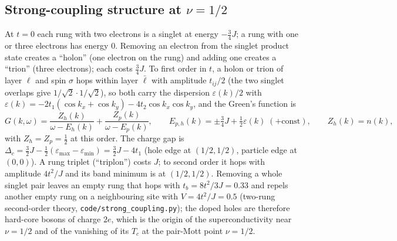 \documentclass[11pt]{article}
\newcommand{\nuh}{\nu=1/2}
\begin{document}
\subsection{Strong-coupling structure at $\nuh$}\label{sec:sc}
At $t=0$ each rung with two electrons is a singlet at energy $-\tfrac34J$; a rung with one or three electrons has energy $0$. Removing an electron from the singlet product state creates a ``holon'' (one electron on the rung) and adding one creates a ``trion'' (three electrons); each costs $\tfrac34J$. To first order in $t$, a holon or trion of layer $\ell$ and spin $\sigma$ hops within layer $\bar\ell$ with amplitude $t_{ij}/2$ (the two singlet overlaps give $1/\sqrt2\cdot1/\sqrt2$), so both carry the dispersion $\varepsilon(k)/2$ with $\varepsilon(k)=-2t_1(\cos k_x+\cos k_y)-4t_2\cos k_x\cos k_y$, and the Green's function is
\begin{equation}
G(k,\omega)=\frac{Z_h(k)}{\omega-E_h(k)}+\frac{Z_p(k)}{\omega-E_p(k)},\qquad E_{p,h}(k)=\pm\tfrac34J+\tfrac12\varepsilon(k)\;(+\text{const}),\qquad Z_h(k)=n(k),
\label{eq:G}
\end{equation}
with $Z_h=Z_p=\tfrac12$ at this order. The charge gap is $\Delta_c=\tfrac32J-\tfrac12(\varepsilon_{\max}-\varepsilon_{\min})=\tfrac32J-4t_1$ (hole edge at $(1/2,1/2)$, particle edge at $(0,0)$). A rung triplet (``triplon'') costs $J$; to second order it hops with amplitude $4t^2/J$ and its band minimum is at $(1/2,1/2)$. Removing a whole singlet pair leaves an empty rung that hops with $t_b=8t^2/3J=0.33$ and repels another empty rung on a neighbouring site with $V=4t^2/J=0.5$ (two-rung second-order theory, \texttt{code/strong\_coupling.py}); the doped holes are therefore hard-core bosons of charge $2e$, which is the origin of the superconductivity near $\nuh$ and of the vanishing of its $T_c$ at the pair-Mott point $\nuh$.
\end{document}
